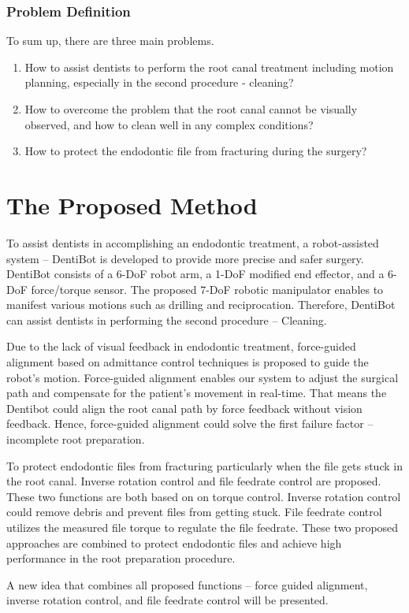 \subsubsection{Problem Definition}
\hspace*{6mm}To sum up, there are three main problems.
\begin{enumerate}
\item How to assist dentists to perform the root canal treatment including motion planning, especially in the second procedure - cleaning?
\item How to overcome the problem that the root canal cannot be visually observed, and how to clean well in any complex conditions?
\item How to protect the endodontic file from fracturing during the surgery?
\end{enumerate}	
\section{The Proposed Method}
\hspace*{6mm}To assist dentists in accomplishing an endodontic treatment, a robot-assisted system -- DentiBot is developed to provide more precise and safer surgery. DentiBot consists of a 6-DoF robot arm, a 1-DoF modified end effector, and a 6-DoF force/torque sensor. The proposed 7-DoF robotic manipulator enables to manifest various motions such as drilling and reciprocation. Therefore, DentiBot can assist dentists in performing the second procedure -- Cleaning.
\par
Due to the lack of visual feedback in endodontic treatment, force-guided alignment based on admittance control techniques is proposed to guide the robot's motion. Force-guided alignment enables our system to adjust the surgical path and compensate for the patient's movement in real-time. That means the Dentibot could align the root canal path by force feedback without vision feedback. Hence, force-guided alignment could solve the first failure factor -- incomplete root preparation.
\par
To protect endodontic files from fracturing particularly when the file gets stuck in the root canal. Inverse rotation control and file feedrate control are proposed. These two functions are both based on on torque control. Inverse rotation control could remove debris and prevent files from getting stuck. File feedrate control utilizes the measured file torque to regulate the file feedrate. These two proposed approaches are combined to protect endodontic files and achieve high performance in the root preparation procedure. 
\par 
A new idea that combines all proposed functions -- force guided alignment, inverse rotation control, and file feedrate control will be presented.
